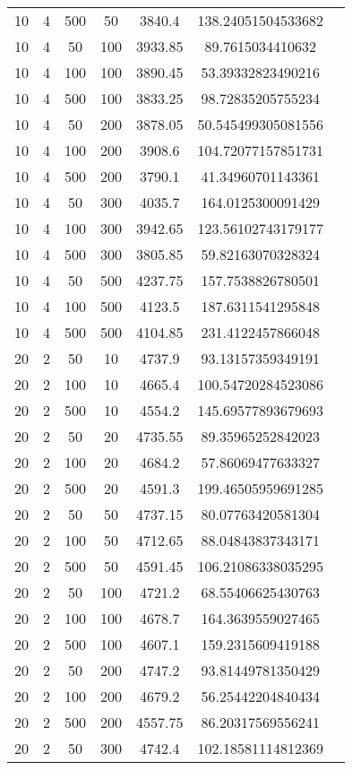 {\begin{longtabu}{S
S
S
S
S
S[round-mode=places, round-precision=0]
S[round-mode=places, round-precision=0]}
10 & 4 & 500 & 50 & 3840.4 & 138.24051504533682 \\
10 & 4 & 50 & 100 & 3933.85 & 89.7615034410632 \\
10 & 4 & 100 & 100 & 3890.45 & 53.39332823490216 \\
10 & 4 & 500 & 100 & 3833.25 & 98.72835205755234 \\
10 & 4 & 50 & 200 & 3878.05 & 50.545499305081556 \\
10 & 4 & 100 & 200 & 3908.6 & 104.72077157851731 \\
10 & 4 & 500 & 200 & 3790.1 & 41.34960701143361 \\
10 & 4 & 50 & 300 & 4035.7 & 164.0125300091429 \\
10 & 4 & 100 & 300 & 3942.65 & 123.56102743179177 \\
10 & 4 & 500 & 300 & 3805.85 & 59.82163070328324 \\
10 & 4 & 50 & 500 & 4237.75 & 157.7538826780501 \\
10 & 4 & 100 & 500 & 4123.5 & 187.6311541295848 \\
10 & 4 & 500 & 500 & 4104.85 & 231.4122457866048 \\
20 & 2 & 50 & 10 & 4737.9 & 93.13157359349191 \\
20 & 2 & 100 & 10 & 4665.4 & 100.54720284523086 \\
20 & 2 & 500 & 10 & 4554.2 & 145.69577893679693 \\
20 & 2 & 50 & 20 & 4735.55 & 89.35965252842023 \\
20 & 2 & 100 & 20 & 4684.2 & 57.86069477633327 \\
20 & 2 & 500 & 20 & 4591.3 & 199.46505959691285 \\
20 & 2 & 50 & 50 & 4737.15 & 80.07763420581304 \\
20 & 2 & 100 & 50 & 4712.65 & 88.04843837343171 \\
20 & 2 & 500 & 50 & 4591.45 & 106.21086338035295 \\
20 & 2 & 50 & 100 & 4721.2 & 68.55406625430763 \\
20 & 2 & 100 & 100 & 4678.7 & 164.3639559027465 \\
20 & 2 & 500 & 100 & 4607.1 & 159.2315609419188 \\
20 & 2 & 50 & 200 & 4747.2 & 93.81449781350429 \\
20 & 2 & 100 & 200 & 4679.2 & 56.25442204840434 \\
20 & 2 & 500 & 200 & 4557.75 & 86.20317569556241 \\
20 & 2 & 50 & 300 & 4742.4 & 102.18581114812369 \\

\end{longtabu}}
